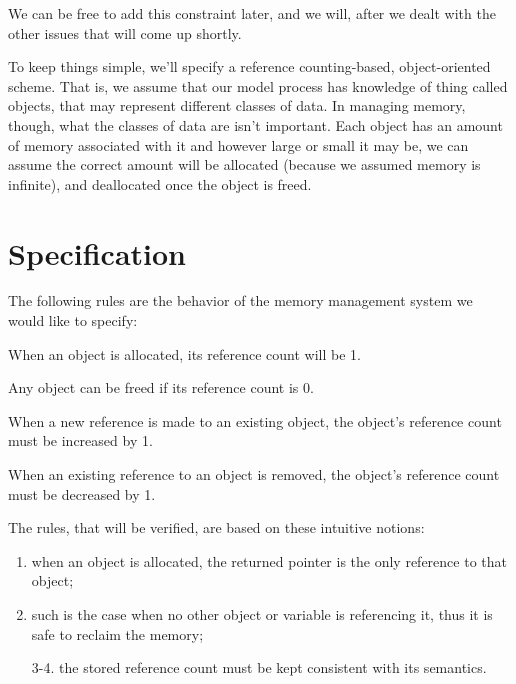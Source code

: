 We can be free to add this constraint later, and we will, after we dealt with the other issues that will come up shortly.

To keep things simple, we'll specify a reference counting-based, object-oriented scheme.
That is, we assume that our model process has knowledge of thing called objects, that may represent different classes of data.
In managing memory, though, what the classes of data are isn't important.
Each object has an amount of memory associated with it and however large or small it may be, we can assume the correct amount will be allocated (because we assumed memory is infinite), and deallocated once the object is freed.

\section{Specification}\label{sec:specification}

The following rules are the behavior of the memory management system we would like to specify:

\begin{myrule}\label{refcount:allocate-1}
	When an object is allocated, its reference count will be 1.
\end{myrule}

\begin{myrule}\label{refcount:free-when-0}
	Any object can be freed if its reference count is 0.
\end{myrule}

\begin{myrule}\label{refcount:incref}
	When a new reference is made to an existing object, the object's reference count must be increased by 1.
\end{myrule}

\begin{myrule}\label{refcount:decref}
	When an existing reference to an object is removed, the object's reference count must be decreased by 1.
\end{myrule}

The rules, that will be verified, are based on these intuitive notions:
\begin{enumerate}
	\item when an object is allocated, the returned pointer is the only reference to that object;
	\item such is the case when no other object or variable is referencing it, thus it is safe to reclaim the memory;
	\item[3-4.] the stored reference count must be kept consistent with its semantics.
\end{enumerate}

